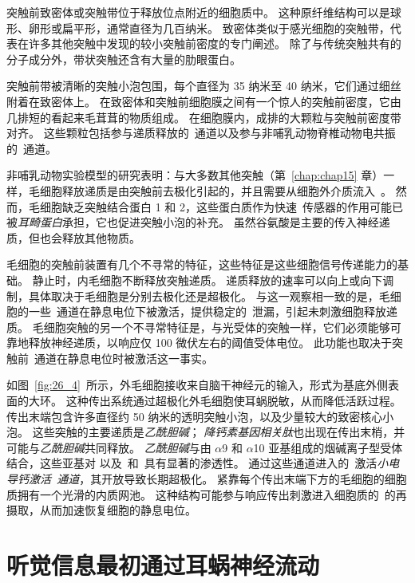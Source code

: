 突触前致密体或突触带位于释放位点附近的细胞质中。
这种原纤维结构可以是球形、卵形或扁平形，通常直径为几百纳米。
致密体类似于感光细胞的突触带，代表在许多其他突触中发现的较小突触前密度的专门阐述。
除了与传统突触共有的分子成分外，带状突触还含有大量的肋眼蛋白。


突触前带被清晰的突触小泡包围，每个直径为 35 纳米至 40 纳米，它们通过细丝附着在致密体上。
在致密体和突触前细胞膜之间有一个惊人的突触前密度，它由几排短的看起来毛茸茸的物质组成。
在细胞膜内，成排的大颗粒与突触前密度带对齐。
这些颗粒包括参与递质释放的~通道以及参与非哺乳动物脊椎动物电共振的~通道。


非哺乳动物实验模型的研究表明：与大多数其他突触（第~\ref{chap:chap15} 章）一样，毛细胞释放递质是由突触前去极化引起的，并且需要从细胞外介质流入~。
然而，毛细胞缺乏突触结合蛋白 1 和 2，这些蛋白质作为快速~传感器的作用可能已被\textit{耳畸蛋白}承担，它也促进突触小泡的补充。
虽然谷氨酸是主要的传入神经递质，但也会释放其他物质。


毛细胞的突触前装置有几个不寻常的特征，这些特征是这些细胞信号传递能力的基础。
静止时，内毛细胞不断释放突触递质。
递质释放的速率可以向上或向下调制，具体取决于毛细胞是分别去极化还是超极化。
与这一观察相一致的是，毛细胞的一些~通道在静息电位下被激活，提供稳定的~泄漏，引起未刺激细胞释放递质。
毛细胞突触的另一个不寻常特征是，与光受体的突触一样，它们必须能够可靠地释放神经递质，以响应仅 100 微伏左右的阈值受体电位。
此功能也取决于突触前~通道在静息电位时被激活这一事实。


如图~\ref{fig:26_4}~所示，外毛细胞接收来自脑干神经元的输入，形式为基底外侧表面的大环。
这种传出系统通过超极化外毛细胞使耳蜗脱敏，从而降低活跃过程。
传出末端包含许多直径约 50 纳米的透明突触小泡，以及少量较大的致密核心小泡。
这些突触的主要递质是\textit{乙酰胆碱}；
\textit{降钙素基因相关肽}也出现在传出末梢，并可能与\textit{乙酰胆碱}共同释放。
\textit{乙酰胆碱}与由 $\alpha$9 和 $\alpha$10 亚基组成的烟碱离子型受体结合，这些亚基对  以及~和~具有显著的渗透性。
通过这些通道进入的~激活\textit{小电导钙激活~通道}，其开放导致长期超极化。
紧靠每个传出末端下方的毛细胞的细胞质拥有一个光滑的内质网池。
这种结构可能参与响应传出刺激进入细胞质的~的再摄取，从而加速恢复细胞的静息电位。



\section{听觉信息最初通过耳蜗神经流动}

